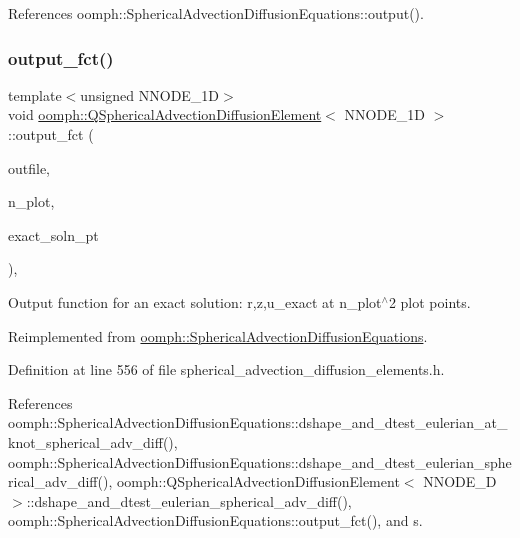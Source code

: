 References oomph\+::\+Spherical\+Advection\+Diffusion\+Equations\+::output().

\mbox{\label{classoomph_1_1QSphericalAdvectionDiffusionElement_ae67830606f8940978529b305794ec98d}} 
\subsubsection{\texorpdfstring{output\+\_\+fct()}{output\_fct()}}
{\footnotesize\ttfamily template$<$unsigned N\+N\+O\+D\+E\+\_\+1D$>$ \\
void \hyperlink{classoomph_1_1QSphericalAdvectionDiffusionElement}{oomph\+::\+Q\+Spherical\+Advection\+Diffusion\+Element}$<$ N\+N\+O\+D\+E\+\_\+1D $>$\+::output\+\_\+fct (\begin{DoxyParamCaption}\item[{std\+::ostream \&}]{outfile,  }\item[{const unsigned \&}]{n\+\_\+plot,  }\item[{\hyperlink{classoomph_1_1FiniteElement_a690fd33af26cc3e84f39bba6d5a85202}{Finite\+Element\+::\+Steady\+Exact\+Solution\+Fct\+Pt}}]{exact\+\_\+soln\+\_\+pt }\end{DoxyParamCaption})\hspace{0.3cm}{\ttfamily [inline]}, {\ttfamily [virtual]}}



Output function for an exact solution\+: r,z,u\+\_\+exact at n\+\_\+plot$^\wedge$2 plot points. 



Reimplemented from \hyperlink{classoomph_1_1SphericalAdvectionDiffusionEquations_a2fcb664a740cfb2a645b0e1893a00773}{oomph\+::\+Spherical\+Advection\+Diffusion\+Equations}.



Definition at line 556 of file spherical\+\_\+advection\+\_\+diffusion\+\_\+elements.\+h.



References oomph\+::\+Spherical\+Advection\+Diffusion\+Equations\+::dshape\+\_\+and\+\_\+dtest\+\_\+eulerian\+\_\+at\+\_\+knot\+\_\+spherical\+\_\+adv\+\_\+diff(), oomph\+::\+Spherical\+Advection\+Diffusion\+Equations\+::dshape\+\_\+and\+\_\+dtest\+\_\+eulerian\+\_\+spherical\+\_\+adv\+\_\+diff(), oomph\+::\+Q\+Spherical\+Advection\+Diffusion\+Element$<$ N\+N\+O\+D\+E\+\_\+D $>$\+::dshape\+\_\+and\+\_\+dtest\+\_\+eulerian\+\_\+spherical\+\_\+adv\+\_\+diff(), oomph\+::\+Spherical\+Advection\+Diffusion\+Equations\+::output\+\_\+fct(), and s.


